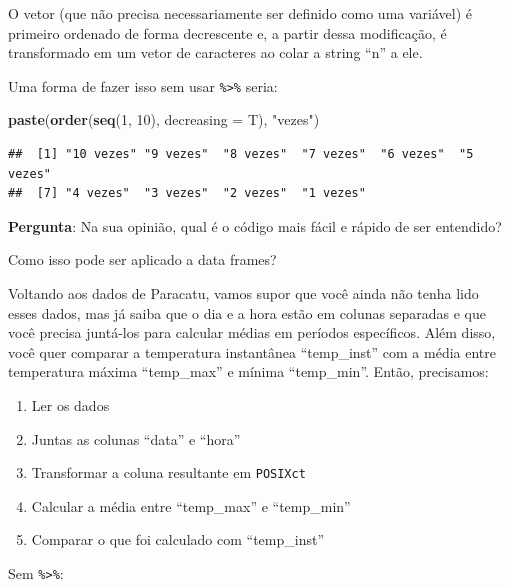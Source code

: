 \documentclass[]{book}
\newenvironment{Shaded}{\begin{snugshade}}{\end{snugshade}}
\newcommand{\KeywordTok}[1]{\textcolor[rgb]{0.13,0.29,0.53}{\textbf{#1}}}
\newcommand{\DataTypeTok}[1]{\textcolor[rgb]{0.13,0.29,0.53}{#1}}
\newcommand{\DecValTok}[1]{\textcolor[rgb]{0.00,0.00,0.81}{#1}}
\newcommand{\StringTok}[1]{\textcolor[rgb]{0.31,0.60,0.02}{#1}}
\newcommand{\NormalTok}[1]{#1}
\providecommand{\tightlist}{%
  \setlength{\itemsep}{0pt}\setlength{\parskip}{0pt}}
\theoremstyle{definition}
\theoremstyle{definition}
\theoremstyle{definition}
\theoremstyle{remark}
\begin{document}
O vetor (que não precisa necessariamente ser definido como uma variável)
é primeiro ordenado de forma decrescente e, a partir dessa modificação,
é transformado em um vetor de caracteres ao colar a string ``n'' a ele.

Uma forma de fazer isso sem usar \texttt{\%\textgreater{}\%} seria:

\begin{Shaded}
\begin{Highlighting}[]
\KeywordTok{paste}\NormalTok{(}\KeywordTok{order}\NormalTok{(}\KeywordTok{seq}\NormalTok{(}\DecValTok{1}\NormalTok{, }\DecValTok{10}\NormalTok{), }\DataTypeTok{decreasing =}\NormalTok{ T), }\StringTok{"vezes"}\NormalTok{)}
\end{Highlighting}
\end{Shaded}

\begin{verbatim}
##  [1] "10 vezes" "9 vezes"  "8 vezes"  "7 vezes"  "6 vezes"  "5 vezes" 
##  [7] "4 vezes"  "3 vezes"  "2 vezes"  "1 vezes"
\end{verbatim}

{\textbf{Pergunta}: Na sua opinião, qual é o código mais fácil e rápido
de ser entendido?}

Como isso pode ser aplicado a data frames?

Voltando aos dados de Paracatu, vamos supor que você ainda não tenha
lido esses dados, mas já saiba que o dia e a hora estão em colunas
separadas e que você precisa juntá-los para calcular médias em períodos
específicos. Além disso, você quer comparar a temperatura instantânea
``temp\_inst'' com a média entre temperatura máxima ``temp\_max'' e
mínima ``temp\_min''. Então, precisamos:

\begin{enumerate}
\def\labelenumi{\arabic{enumi}.}
\tightlist
\item
  Ler os dados\\
\item
  Juntas as colunas ``data'' e ``hora''\\
\item
  Transformar a coluna resultante em \texttt{POSIXct}\\
\item
  Calcular a média entre ``temp\_max'' e ``temp\_min''\\
\item
  Comparar o que foi calculado com ``temp\_inst''
\end{enumerate}

Sem \texttt{\%\textgreater{}\%}:
\end{document}
